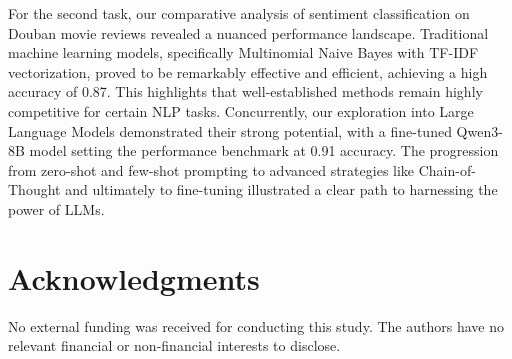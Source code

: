\documentclass{article}
\begin{document}
For the second task, our comparative analysis of sentiment classification on Douban movie reviews 
revealed a nuanced performance landscape. Traditional machine learning models, specifically Multinomial
Naive Bayes with TF-IDF vectorization, proved to be remarkably effective and efficient, achieving a high accuracy of 0.87. 
This highlights that well-established methods remain highly competitive for certain NLP tasks. 
Concurrently, our exploration into Large Language Models demonstrated their strong potential, 
with a fine-tuned Qwen3-8B model setting the performance benchmark at 0.91 accuracy. 
The progression from zero-shot and few-shot prompting to advanced strategies like Chain-of-Thought 
and ultimately to fine-tuning illustrated a clear path to harnessing the power of LLMs.

\section{Acknowledgments}
\label{sec:acknowledgments}
No external funding was received for conducting this study. The authors have no relevant financial or non-financial interests to disclose.


% 

\end{document}
